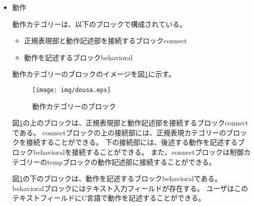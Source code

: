 \documentclass{risepaper}
\begin{document}
\begin{itemize}
\item 動作

動作カテゴリーは、以下のブロックで構成されている。

\begin{itemize}
\item 正規表現部と動作記述部を接続するブロックconnect
\item 動作を記述するブロックbehavioral
\end{itemize}

動作カテゴリーのブロックのイメージを図\ref{fig:dousa}に示す。

\begin{figure}[h]
\begin{center}
\texttt{[image: img/dousa.eps]}
\end{center}%
\caption{動作カテゴリーのブロック}%
\label{fig:dousa}
\end{figure}%

図\ref{fig:dousa}の上のブロックは、正規表現部と動作記述部を接続するブロックconnectである。
connectブロックの上の接続部には、正規表現カテゴリーのブロックを接続することができる。
下の接続部には、後述する動作を記述するブロックbehavioralを接続することができる。
また、connectブロックは制御カテゴリーのtempブロックの動作記述部に接続することができる。

図\ref{fig:dousa}の下のブロックは、動作を記述するブロックbehavioralである。
behavioralブロックにはテキスト入力フィールドが存在する。
ユーザはこのテキストフィールドにC言語で動作を記述することができる。

\end{itemize}
\end{document}
